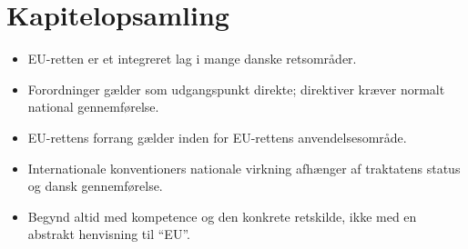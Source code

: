 \section*{Kapitelopsamling}
\begin{itemize}
  \item EU-retten er et integreret lag i mange danske retsområder.
  \item Forordninger gælder som udgangspunkt direkte; direktiver kræver normalt national gennemførelse.
  \item EU-rettens forrang gælder inden for EU-rettens anvendelsesområde.
  \item Internationale konventioners nationale virkning afhænger af traktatens status og dansk gennemførelse.
  \item Begynd altid med kompetence og den konkrete retskilde, ikke med en abstrakt henvisning til ``EU''.
\end{itemize}
